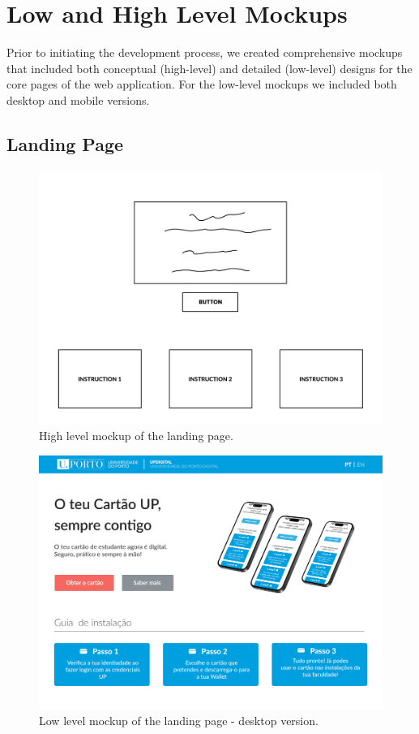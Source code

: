 \documentclass[10pt]{article}
\begin{document}
\section{Low and High Level Mockups}

Prior to initiating the development process, we created comprehensive mockups that included both conceptual (high-level) and detailed (low-level) designs for the core pages of the web application. For the low-level mockups we included both desktop and mobile versions.

\subsection{Landing Page}

\begin{figure}[H]
  \centering
  \includegraphics[width=1\linewidth]{report-images/landing-page-high-level.png}
  \caption{High level mockup of the landing page.}
  \label{fig:fig-1}
\end{figure}

\begin{figure}[H]
  \centering
  \includegraphics[width=1\linewidth]{report-images/landing-page-desktop.png}
  \caption{Low level mockup of the landing page - desktop version.}
  \label{fig:fig-2}
\end{figure}
\end{document}
